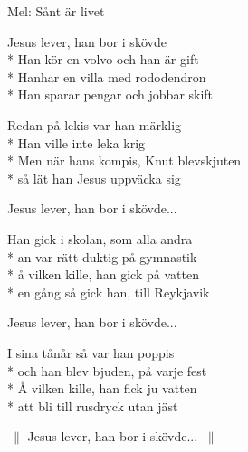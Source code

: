\begin{SongText}
    \begin{SongInfo}
        Mel: Sånt är livet
    \end{SongInfo}
    \begin{SongVerse}
        Jesus lever, han bor i skövde\\*%
        Han kör en volvo och han är gift\\*%
        Hanhar en villa med rododendron\\*%
        Han sparar pengar och jobbar skift
    \end{SongVerse}
    \begin{SongVerse}
        Redan på lekis var han märklig\\*%
        Han ville inte leka krig\\*%
        Men när hans kompis, Knut blevskjuten\\*%
        så lät han Jesus uppväcka sig
    \end{SongVerse}
    \begin{SongVerse}
        Jesus lever, han bor i skövde...
    \end{SongVerse}
    \begin{SongVerse}
        Han gick i skolan, som alla andra\\*%
        an var rätt duktig på gymnastik\\*%
        å vilken kille, han gick på vatten\\*%
        en gång så gick han, till Reykjavik
    \end{SongVerse}
    \begin{SongVerse}
        Jesus lever, han bor i skövde...
    \end{SongVerse}
    \begin{SongVerse}
        I sina tånår så var han poppis\\*%
        och han blev bjuden, på varje fest\\*%
        Å vilken kille, han fick ju vatten \\*%
        att bli till rusdryck utan jäst
    \end{SongVerse}
    \begin{SongVerse}
        $\:\|$ Jesus lever, han bor i skövde... $\:\|$
    \end{SongVerse}
\end{SongText}
